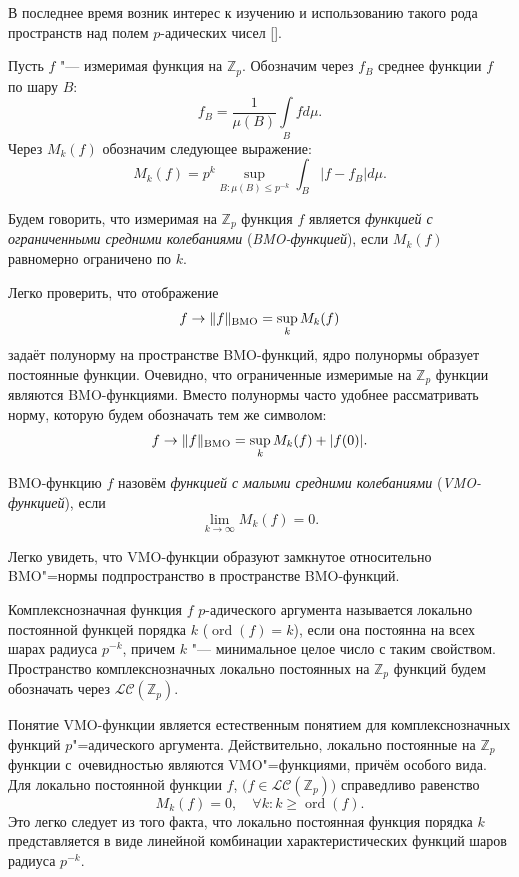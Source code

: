 В последнее время возник интерес к изучению и использованию такого рода пространств над полем $p$-адических чисел [].

Пусть $f$ "--- измеримая функция на $\mathbb Z_p$. Обозначим через
$f_B$  среднее функции $f$ по шару $B$:
$$
f_B=\frac{1}{\mu(B)}\int \limits_B f d \mu.
$$
Через $M_k(f)$ обозначим следующее выражение:
$$
M_k(f)=p^k\sup_{B\colon \mu(B) \leq p^{-k}}\int_B\left|f-f_B\right|d\mu.
$$

\begin{definition}[1]Будем говорить, что измеримая на $\mathbb Z_p$ функция $f$
является \textit{функцией с ограниченными средними колебаниями}
(\textit{BMO-функцией}\/), если $M_k(f)$ равномерно ограничено по $k$.
\end{definition}

\smallskip

Легко проверить, что отображение
$$
f \to \|f\|_{\rm BMO}=\sup_k M_k(f)
$$
задаёт полунорму на пространстве BMO-функций, ядро полунормы
образует постоянные функции. Очевидно, что ограниченные измеримые
на $\mathbb Z_p$ функции являются BMO-функциями. Вместо полунормы
часто удобнее рассматривать норму, которую будем обозначать тем же
символом:
$$
f \to \|f\|_{\rm BMO}=\sup_k M_k(f)+|f(0)|.
$$

\begin{definition}[2]BMO-функцию $f$ назовём \textit{функцией с малыми средними колебаниями}
(\textit{VMO-функцией}\/), если
$$
\lim_{k\to\infty}M_k(f)=0.
$$
\end{definition}

\smallskip

Легко увидеть, что VMO-функции образуют замкнутое относительно \linebreak
BMO"=нормы подпространство в пространстве BMO-функций.

Комплекснозначная функция $f$ $p$-адического аргумента называется
локально постоянной функцей порядка $k$ ($\mathop{\mathrm{ord}}\nolimits (f)=k$), если она
постоянна на всех шарах радиуса $p^{-k}$, причем $k$ "---
минимальное целое число с таким свойством. Пространство
комплекснозначных локально постоянных на $\mathbb Z_p$ функций
будем обозначать через $\mathcal L\mathcal C \left(\mathbb
Z_p\right)$.

\smallskip

Понятие VMO-функции является естественным понятием для комплекснозначных функций $p$"=адического аргумента. 
Действительно, локально постоянные на $\mathbb Z_p$ функции с~очевидностью являются VMO"=функциями, причём особого вида. 
Для локально постоянной функции $f$, $\big(f \in \mathcal L\mathcal C \left(\mathbb
Z_p\right)\big)$ справедливо равенство
$$
M_k(f)=0, \quad \forall k\colon k\geq \mathop{\mathrm{ord}}\nolimits (f).
$$
Это легко следует из того факта, что локально постоянная функция
порядка $k$ представляется  в виде линейной комбинации
характеристических функций шаров радиуса $p^{-k}$.


